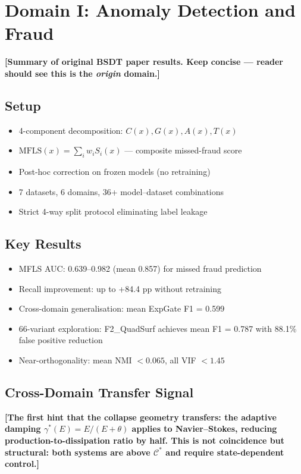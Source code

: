 \documentclass[11pt,a4paper]{article}
\newcommand{\MFLS}{\mathrm{MFLS}}
\newcommand{\Cman}{\mathcal{C}^*}
\begin{document}
\section{Domain I: Anomaly Detection and Fraud}\label{sec:fraud}

\textbf{[Summary of original BSDT paper results. Keep concise —
reader should see this is the \emph{origin} domain.]}

\subsection{Setup}
\begin{itemize}[nosep]
  \item 4-component decomposition: $C(x), G(x), A(x), T(x)$
  \item $\MFLS(x) = \sum_i w_i S_i(x)$ — composite missed-fraud score
  \item Post-hoc correction on frozen models (no retraining)
  \item 7 datasets, 6 domains, 36+ model--dataset combinations
  \item Strict 4-way split protocol eliminating label leakage
\end{itemize}

\subsection{Key Results}
\begin{itemize}[nosep]
  \item MFLS AUC: 0.639--0.982 (mean 0.857) for missed fraud prediction
  \item Recall improvement: up to +84.4 pp without retraining
  \item Cross-domain generalisation: mean ExpGate F1 = 0.599
  \item 66-variant exploration: F2\_QuadSurf achieves mean F1 = 0.787
        with 88.1\% false positive reduction
  \item Near-orthogonality: mean NMI $< 0.065$, all VIF $< 1.45$
\end{itemize}

\subsection{Cross-Domain Transfer Signal}
\textbf{[The first hint that the collapse geometry transfers: the
adaptive damping $\gamma^*(E) = E/(E + \theta)$ applies to
Navier--Stokes, reducing production-to-dissipation ratio by half.
This is not coincidence but structural: both systems are above
$\Cman$ and require state-dependent control.]}
\end{document}
